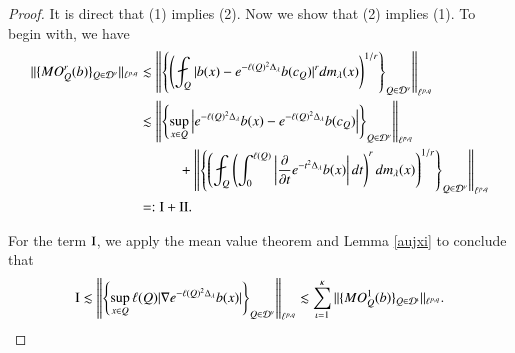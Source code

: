 \documentclass[12pt]{amsart}
\begin{document}
\begin{proof}
It is direct that (1) implies (2). Now we show that (2) implies (1).
To begin with, we have
\begin{align*}
\|\{MO_Q^r(b)\}_{Q\in\mathcal{D}^\nu}\|_{\ell^{p,q}}
&\lesssim \left\|\left\{\left(\fint_Q|b(x)-e^{-\ell(Q)^2 \Delta_\lambda }b(c_Q)|^rdm_\lambda(x)\right)^{1/r}\right\}_{Q\in\mathcal{D}^\nu}\right\|_{\ell^{p,q}}\\
&\lesssim \left\|\left\{\sup\limits_{x\in Q}\left|e^{-\ell(Q)^2 \Delta_\lambda}b(x)-e^{-\ell(Q)^2\Delta_\lambda}b(c_Q)\right|\right\}_{Q\in\mathcal{D}^\nu}\right\|_{\ell^{p,q}}\\
&\hspace{1.0cm}+\left\|\left\{\left(\fint_Q \left(\int_0^{\ell(Q)}\left|\frac{\partial}{\partial t}e^{-t^2 \Delta_\lambda }b(x)\right|dt\right)^rdm_\lambda(x)\right)^{1/r}\right\}_{Q\in\mathcal{D}^\nu}\right\|_{\ell^{p,q}}\\
&=:{\rm I}+{\rm II}.
\end{align*}

For the term ${\rm I}$, we apply the mean value theorem and Lemma \ref{aujxi} to conclude that
\begin{align*}
{\rm I}\lesssim\left\|\left\{\sup\limits_{x\in Q}\ell(Q)|\nabla e^{-\ell(Q)^2 \Delta_\lambda}b(x)|\right\}_{Q\in\mathcal{D}^\nu}\right\|_{\ell^{p,q}}
\lesssim \sum_{\iota=1}^\kappa\|\{MO_Q^1(b)\}_{Q\in\mathcal{D}^\iota}\|_{\ell^{p,q}}.
\end{align*}





\end{proof}
\end{document}
